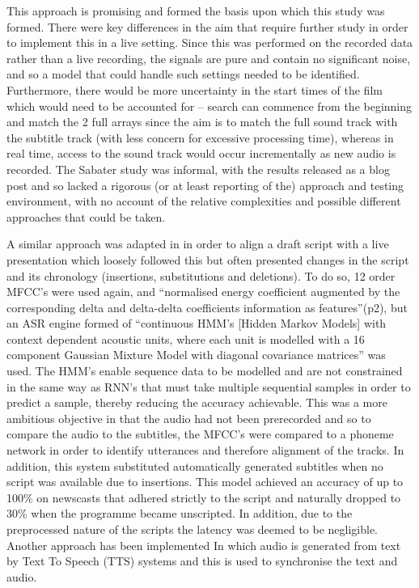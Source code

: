 This approach is promising and formed the basis upon which this study was formed. There were key differences in the aim that require further study in order to implement this in a live setting.  Since this was performed on the recorded data rather than a live recording, the signals are pure and contain no significant noise, and so a model that could handle such settings needed to be identified. Furthermore, there would be more uncertainty in the start times of the film which would need to be accounted for – search can commence from the beginning and match the 2 full arrays since the aim is to match the full sound track with the subtitle track (with less concern for excessive processing time), whereas in real time, access to the sound track would occur incrementally as new audio is recorded. The Sabater study was informal, with the results released as a blog post and so lacked a rigorous (or at least reporting of the) approach and testing environment, with no account of the relative complexities and possible different approaches that could be taken. \newline

A similar approach was adapted in \cite{Ortega2009} in order to align a draft script with a live presentation which loosely followed this but often presented changes in the script and its chronology (insertions, substitutions and deletions). To do so, 12 order MFCC’s were used again, and “normalised energy coefficient augmented by the corresponding delta and delta-delta coefficients information as features”(p2), but an ASR engine formed of “continuous HMM's [Hidden Markov Models] with context dependent acoustic units, where each unit is modelled with a 16 component Gaussian Mixture Model with diagonal covariance matrices” was used. The HMM’s enable sequence data to be modelled and are not constrained in the same way as RNN’s that must take multiple sequential samples in order to predict a sample, thereby reducing the accuracy achievable. This was a more ambitious objective in that the audio had not been prerecorded and so to compare the audio to the subtitles, the MFCC’s were compared to a phoneme network in order to identify utterances and therefore alignment of the tracks. In addition, this system substituted automatically generated subtitles when no script was available due to insertions.
This model achieved an accuracy of up to 100\% on newscasts that adhered strictly to the script and naturally dropped to 30\% when the programme became unscripted. In addition, due to the preprocessed nature of the scripts the latency was deemed to be negligible. 
Another approach has been implemented \cite{Campbell1996} In which audio is generated from text by Text To Speech (TTS) systems and this is used to synchronise the text and audio. %